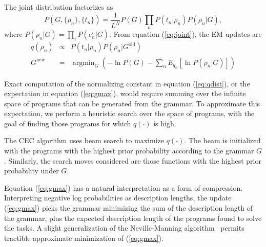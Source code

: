 \documentclass{article} %
\begin{document}
The joint distribution factorizes as
\begin{equation}
P(G,\{\rho_n\},\{t_n\}) = \frac{1}{L^N} P(G) \prod_n P(t_n | \rho_n) P(\rho_n | G),
\label{eq:joint}
\end{equation}
where $P(\rho_n | G) = \prod_i P(e^i_n | G)$.
From equation (\ref{eq:joint}), the EM updates are
\begin{eqnarray}
\label{eq:qdist}
q(\rho_n) &\propto& P(t_n | \rho_n) P(\rho_n | G^{\text{old}})\\
 \label{eq:gmax}
G^{\text{new}} &=& \operatorname{argmin}_G \left( -\ln P(G) -
\sum_n 
E_{q_n}
 \left[ \ln P(\rho_n | G) \right] \right)
\end{eqnarray}

Exact computation of the normalizing constant in equation (\ref{eq:qdist}), or the expectation in equation (\ref{eq:gmax}), would require summing over the infinite space of programs that can be generated from the grammar. To approximate this expectation, we perform a heuristic search over the space of programs, with the goal of finding those programs for which $q(\cdot)$ is high.

The CEC algorithm uses beam search \cite{Russell:2003:AIM:773294} to maximize $q(\cdot )$.
The beam is initialized with the programs with the highest prior probability according to the grammar $G$.
Similarly, the search moves considered are those functions with the highest prior probability under $G$.

Equation (\ref{eq:gmax}) has a natural interpretation as a form of compression.
Interpreting negative log probabilities as description lengths, the update (\ref{eq:gmax}) picks the grammar minimizing the sum of the description length of the grammar, plus the expected description length of the programs found to solve the tasks.
A slight generalization of the Neville-Manning algorithm~\cite{DBLP:journals/corr/cs-AI-9709102} permits tractible approximate minimization of (\ref{eq:gmax}).
\end{document}
